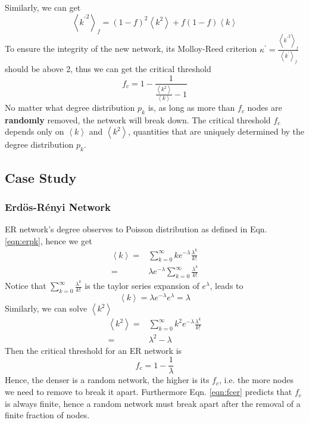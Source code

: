 \documentclass[11pt]{article}
\newcommand{\expbracket}[1]{\left \langle #1  \right \rangle}
\begin{document}
Similarly, we can get 
\begin{equation}
    \expbracket{{k^{\prime}}^2}_f = (1-f)^2 \expbracket{k^2} + f(1-f)\expbracket{k}
\end{equation}
To ensure the integrity of the new network, its Molloy-Reed criterion $\kappa^{\prime}=\frac{\expbracket{{k^{\prime}}^2}_f} {{\expbracket{k^\prime}}_f}$ should be above 2, thus we can get the critical threshold
\begin{equation}
    f_c = 1 - \frac{1}{\frac{\expbracket{k^2}}{\expbracket{k}}-1}
\end{equation}
No matter what degree distribution $p_k$ is, as long as more than $f_c$ nodes are \textbf{randomly} removed, the network will break down. The critical threshold $f_c$ depends only on $\expbracket{k}$ and $\expbracket{k^2}$, quantities that are uniquely determined by the degree distribution $p_k$. 

\subsection{Case Study}
\subsubsection{Erd\"{o}s-R\'{e}nyi Network}
ER network's degree observes to Poisson distribution as defined in Eqn. \ref{eqn:erpk}, hence we get 
\begin{equation}
\begin{split}
        \expbracket{k} = & \sum_{k=0}^{\infty} k e^{-\lambda} \frac{\lambda^k}{k!} \\
        = & \lambda e^{-\lambda} \sum_{k=0}^{\infty} \frac{\lambda^{k}}{k!}
\end{split}
\end{equation}
Notice that $ \sum_{k=0}^{\infty} \frac{\lambda^{k}}{k!}$ is the taylor series expansion of $e^\lambda$, leads to 	
\begin{equation}
    \expbracket{k} = \lambda e^{-\lambda} e^\lambda = \lambda
\end{equation}
Similarly, we can solve $\expbracket{k^2}$
\begin{equation}
\begin{split}
    \expbracket{k^2} = & \sum_{k=0}^{\infty} k^2 e^{-\lambda} \frac{\lambda^k}{k!} \\
    = & \lambda^2 - \lambda
\end{split}
\end{equation}
Then the critical threshold for an ER network is 
\begin{equation}
    f_c = 1 - \frac{1}{\lambda}
    \label{eqn:fcer}
\end{equation}
Hence, the denser is a random network, the higher is its $f_c$, i.e. the more nodes we need to remove to break it apart. Furthermore Eqn. \ref{eqn:fcer} predicts that $f_c$ is always finite, hence a random network must break apart after the removal of a finite fraction of nodes.
\end{document}
